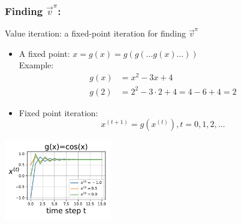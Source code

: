 \begin{frame}\frametitle{Finding $\vec v^\pi$:~\subsubsecname}

Value iteration: a fixed-point iteration for finding $\vec v^\pi$

\begin{itemize}
\item A fixed point: $x=g(x)=g(g(\ldots g(x)\ldots))$\\

Example:
\svspace{-3mm}
\begin{align}
    g(x) &= x^{2} - 3x + 4\\
    g(2) &= 2^{2} - 3\cdot 2 + 4 = 4 - 6 + 4 = 2
\end{align}

\item Fixed point iteration:
\begin{equation}
x^{(t+1)} = g(x^{(t)}), t=0,1,2,\ldots
\end{equation}
\end{itemize}

\begin{center}
    \includegraphics[height=3.5cm]{img/fixed_point_iter_cos} 
\end{center}


\end{frame}



